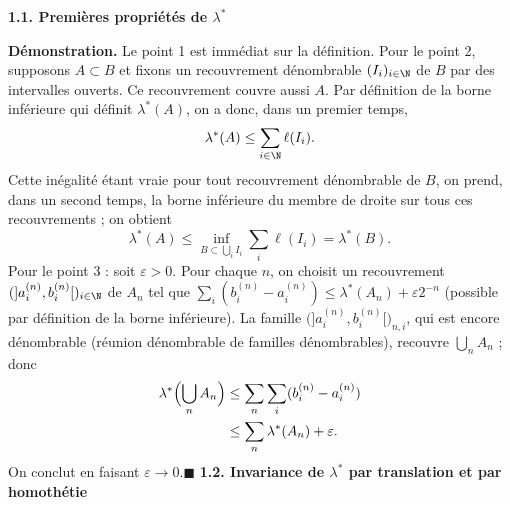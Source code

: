 \textbf{1.1. Premières propriétés de $\lambda^*$}


\textbf{Démonstration.} Le point 1 est immédiat sur la définition. Pour le point 2, supposons $A\subset B$ et fixons un recouvrement dénombrable $(I_i)_{i\in\N}$ de $B$ par des intervalles ouverts. Ce recouvrement couvre aussi $A$. Par définition de la borne inférieure qui définit $\lambda^*(A)$, on a donc, dans un premier temps,
\[\lambda^*(A)\le\sum_{i\in\N}\ell(I_i).\]
Cette inégalité étant vraie pour tout recouvrement dénombrable de $B$, on prend, dans un second temps, la borne inférieure du membre de droite sur tous ces recouvrements ; on obtient
\[\lambda^*(A)\le\inf_{B\subset\bigcup_i I_i}\sum_i\ell(I_i)=\lambda^*(B).\]
Pour le point 3 : soit $\varepsilon>0$. Pour chaque $n$, on choisit un recouvrement $(]a_i^{(n)},b_i^{(n)}[)_{i\in\N}$ de $A_n$ tel que $\sum_i(b_i^{(n)}-a_i^{(n)})\le\lambda^*(A_n)+\varepsilon2^{-n}$ (possible par définition de la borne inférieure). La famille $\bigl(]a_i^{(n)},b_i^{(n)}[\bigr)_{n,i}$, qui est encore dénombrable (réunion dénombrable de familles dénombrables), recouvre $\bigcup_n A_n$ ; donc
\[
\begin{aligned}
\lambda^*\Bigl(\bigcup_n A_n\Bigr)&\le\sum_n\sum_i(b_i^{(n)}-a_i^{(n)})\\
&\le\sum_n\lambda^*(A_n)+\varepsilon.
\end{aligned}
\]
On conclut en faisant $\varepsilon\to0$.\hfill$\blacksquare$
\textbf{1.2. Invariance de $\lambda^*$ par translation et par homothétie}


